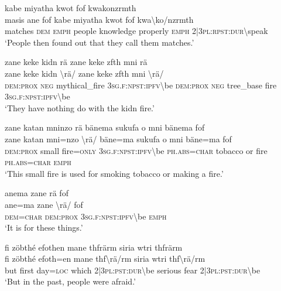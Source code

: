 \ea\label{ex:11:a2581}
kabe miyatha kwot fof kwakonzrmth\\
\gll masis	ane	fof	kabe	miyatha	kwot	fof	kwa{\textbackslash}ko/nzrmth\\
     matches	\textsc{dem}	\textsc{emph}	people	knowledge	properly	\textsc{emph}	2|3\textsc{pl}:\textsc{rpst}:\textsc{dur}{\textbackslash}speak\\
\glt `People then found out that they call them matches.'
\z

\ea\label{ex:11:a2582}
zane keke kidn rä zane keke zfth mni rä\\
\gll zane	keke	kidn	{\textbackslash}rä/	zane	keke	zfth	mni	{\textbackslash}rä/\\
     \textsc{dem}:\textsc{prox}	\textsc{neg}	mythical\_fire	3\textsc{sg}.\textsc{f}:\textsc{npst}:\textsc{ipfv}{\textbackslash}be	\textsc{dem}:\textsc{prox}	\textsc{neg}	tree\_base	fire	3\textsc{sg}.\textsc{f}:\textsc{npst}:\textsc{ipfv}{\textbackslash}be\\
\glt `They have nothing do with the kidn fire.'
\z

\ea\label{ex:11:a2583}
zane katan mninzo rä bänema sukufa o mni bänema fof\\
\gll zane	katan	mni=nzo	{\textbackslash}rä/	bäne=ma	sukufa	o	mni	bäne=ma	fof\\
     \textsc{dem}:\textsc{prox}	small	fire=\textsc{only}	3\textsc{sg}.\textsc{f}:\textsc{npst}:\textsc{ipfv}{\textbackslash}be	\textsc{ph}.\textsc{abs}=\textsc{char}	tobacco	or	fire	\textsc{ph}.\textsc{abs}=\textsc{char}	\textsc{emph}\\
\glt `This small fire is used for smoking tobacco or making a fire.'
\z

\ea\label{ex:11:a2585}
anema zane rä fof\\
\gll ane=ma	zane	{\textbackslash}rä/	fof\\
     \textsc{dem}=\textsc{char}	\textsc{dem}:\textsc{prox}	3\textsc{sg}.\textsc{f}:\textsc{npst}:\textsc{ipfv}{\textbackslash}be	\textsc{emph}\\
\glt `It is for these things.'
\z

\ea\label{ex:11:a2586}
fi zöbthé efothen mane thfrärm siria wtri thfrärm\\
\gll fi	zöbthé	efoth=en	mane	thf{\textbackslash}rä/rm	siria	wtri	thf{\textbackslash}rä/rm\\
     but	first	day=\textsc{loc}	which	2|3\textsc{pl}:\textsc{pst}:\textsc{dur}{\textbackslash}be	serious	fear	2|3\textsc{pl}:\textsc{pst}:\textsc{dur}{\textbackslash}be\\
\glt `But in the past, people were afraid.'
\z

